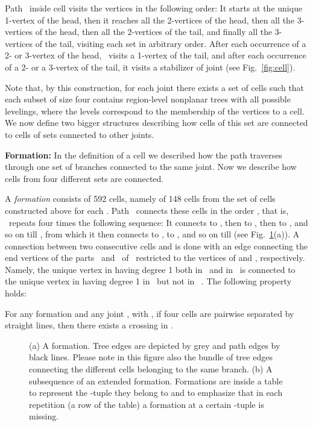 \documentclass[a4paper,10pt]{llncs}
\newcounter{prop}
\newcommand{\T}{\mbox{ }}
\renewcommand{\P}{\mbox{ }}
\begin{document}
Path \P inside cell  visits the vertices in the following order: It starts at the unique 1-vertex of the head, then it reaches all the 2-vertices of the head, then all the 3-vertices of the head, then all the 2-vertices of the tail, and finally all the 3-vertices of the tail, visiting each set in arbitrary order.
After each occurrence of a 2- or 3-vertex of the head, \P visits a 1-vertex of the tail, and after each occurrence of a 2- or a 3-vertex of the tail, it visits a stabilizer of joint  (see Fig.~\ref{fig:cell}).

Note that, by this construction, for each joint there exists a set of cells such that each subset of size four contains region-level nonplanar trees with all possible levelings, where the levels correspond to the membership of the vertices to a cell. We now define two bigger structures describing how cells of this set are connected to cells of sets connected to other joints.

{\bf Formation:}
In the definition of a cell we described how the path traverses through one set of branches connected to the same joint. Now we describe how cells from four different sets are connected.

A {\it formation}  consists of 592 cells, namely of 148 cells  from the set of cells constructed above for each . Path \P connects these cells in the order , that is, \P repeats four times the following sequence: It connects  to , then to , then to , and so on till , from which it then connects to , to , and so on till  (see Fig.~\ref{fig:formation}(a)). A connection between two consecutive cells  and  is done with an edge connecting the end vertices of the parts \P and \P of \P restricted to the vertices of  and , respectively. Namely, the unique vertex in  having degree 1 both in \P and in \T is connected to the unique vertex in  having degree 1 in \P but not in \T. The following property holds:

\noindent
\begin{property}\label{prop:four_sep_areas_PS}
For any formation  and any joint , with , if four cells  are pairwise separated by straight lines, then there exists a crossing in .
\end{property}

\begin{figure}[tb]
\caption{(a) A formation. Tree edges are depicted by grey and path edges by black lines. Please note in this figure also the bundle of tree edges connecting the different cells belonging to the same branch. (b) A subsequence  of an extended formation. Formations are inside a table to represent the -tuple they belong to and to emphasize that in each repetition (a row of the table) a formation at a certain -tuple is missing.}\label{fig:formation}
\end{figure}
\end{document}
